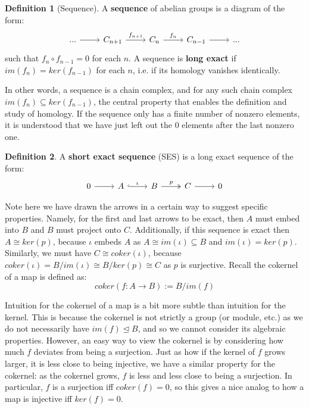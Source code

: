\documentclass[11pt, oneside]{amsart}   	%
\theoremstyle{definition}
\newtheorem{definition}{Definition}[section]
\begin{document}
\begin{definition}[Sequence]
	A \textbf{sequence} of abelian groups is a diagram of the form:
	\begin{equation}\begin{tikzcd}
		...\arrow[r] & C_{n + 1}\arrow[r, "f_{n + 1}"] & C_n\arrow[r, "f_{n}"] & C_{n - 1}\arrow[r] & ...
	\end{tikzcd}\end{equation}
	such that $f_n\circ f_{n - 1} = 0$ for each $n$. A sequence is \textbf{long exact} if $im(f_n) = ker(f_{n - 1})$ for each $n$, 
	i.e. if its homology vanishes identically. 
\end{definition}
In other words, a sequence is a chain complex, and for any such chain complex $im(f_n)\subseteq ker(f_{n - 1})$, the 
central property that enables the definition and study of homology. If the sequence only has a finite number of nonzero 
elements, it is understood that we have just left out the 0 elements after the last nonzero one. 

\begin{definition}
	A \textbf{short exact sequence} (SES) is a long exact sequence of the form:
	\begin{equation}\begin{tikzcd}
		0\arrow[r] & A\arrow[r, "\iota", hook] & B\arrow[r, "p", twoheadrightarrow] & C\arrow[r] & 0 
	\end{tikzcd}\end{equation}
\end{definition}
Note here we have drawn the arrows in a certain way to suggest specific properties. Namely, for the first and last arrows to 
be exact, then $A$ must embed into $B$ and $B$ must project onto $C$. Additionally, if this sequence is exact then 
$A\cong ker(p)$, because $\iota$ embeds $A$ as $A\cong im(\iota)\subseteq B$ and $im(\iota) = ker(p)$. Similarly, 
we must have $C\cong coker(\iota)$, because $coker(\iota) = B / im(\iota)\cong B / ker(p)\cong C$ as $p$ is surjective. 
Recall the cokernel of a map is defined as:
\begin{equation}
	coker(f : A\rightarrow B) := B / im(f)
\end{equation}

Intuition for the cokernel of a map is a bit more subtle than intuition for the kernel. This is because 
the cokernel is not strictly a group (or module, etc.) as we do not necessarily have $im(f)\trianglelefteq B$, and so we cannot 
consider its algebraic properties. However, an easy way to view the cokernel is by considering how much $f$ deviates from 
being a surjection. Just as how if the kernel of $f$ grows larger, it is less close to being injective, we have a similar 
property for the cokernel: as the cokernel grows, $f$ is less and less close to being a surjection. In particular, $f$ is a surjection 
iff $coker(f) = 0$, so this gives a nice analog to how a map is injective iff $ker(f) = 0$. 
\end{document}
